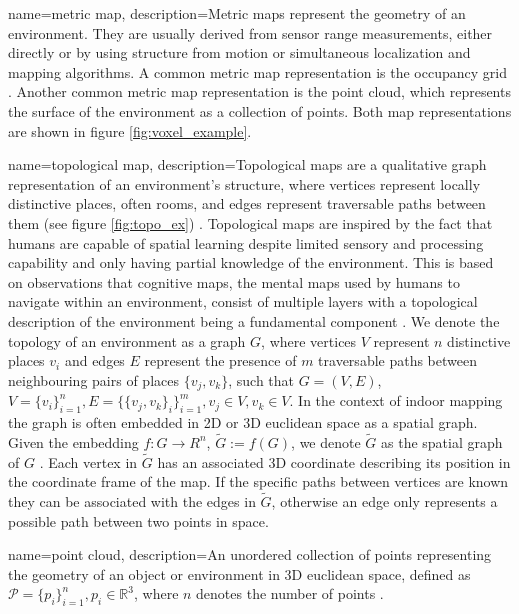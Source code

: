 {
    name=metric map,
    description={Metric maps represent the geometry of an environment. They are usually derived from sensor range measurements, either directly or by using structure from motion or simultaneous localization and mapping algorithms. A common metric map representation is the occupancy grid \citep{andersone_heterogeneous_2019}. Another common metric map representation is the point cloud, which represents the surface of the environment as a collection of points. Both map representations are shown in figure \ref{fig:voxel_example}.}
}

{
    name=topological map,
    description={Topological maps are a qualitative graph representation of an environment's structure, where vertices represent locally distinctive places, often rooms, and edges represent traversable paths between them  (see figure \ref{fig:topo_ex}) \citep{thrun_learning_1998,kuipers_robust_1988}. Topological maps are inspired by the fact that humans are capable of spatial learning despite limited sensory and processing capability and only having partial knowledge of the environment. This is based on observations that cognitive maps, the mental maps used by humans to navigate within an environment, consist of multiple layers with a topological description of the environment being a fundamental component \citep{kuipers_robust_1988,kuipers_modeling_1978}. We denote the topology of an environment as a graph \(G\), where vertices \(V\) represent \(n\) distinctive places \(v_i\) and edges \(E\) represent the presence of \(m\) traversable paths between neighbouring pairs of places \(\{v_j,v_k\}\), such that \(G=(V, E)\), \(V=\{v_i\}_{i=1}^n, E=\{\{v_j,v_k\}_i\}_{i=1}^m, v_j \in V, v_k \in V\). In the context of indoor mapping the graph is often embedded in 2D or 3D euclidean space as a spatial graph. Given the embedding \(f : G \rightarrow R^n\), \( \widetilde{G}:=f(G)\), we denote \(\widetilde{G}\) as the spatial graph of \(G\) \citep{kobayashi_spatial_1994}. Each vertex in \(\widetilde{G}\) has an associated 3D coordinate describing its position in the coordinate frame of the map. If the specific paths between vertices are known they can be associated with the edges in \(\widetilde{G}\), otherwise an edge only represents a possible path between two points in space.}
}

{
    name=point cloud,
    description={An unordered collection of points representing the geometry of an object or environment in 3D euclidean space, defined as \(\mathcal{P}=\{p_i\}_{i=1}^n, p_i \in \mathbb{R}^3\), where \(n\) denotes the number of points \citep{volodine_point_2007}.}
}

